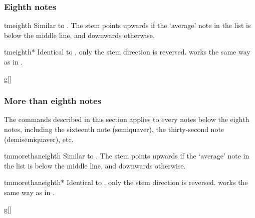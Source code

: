 \documentclass[11pt,a4paper]{ltxdoc}
\begin{document}
\subsubsection{Eighth notes}\label{sec:music-notes:commands:eighth}
\begin{docCommand}{tmeighth}{}
  Similar to . The stem points upwards if the `average' note 
  in the list is below the middle line, and downwards otherwise.
\end{docCommand}
\begin{docCommand}{tmeighth*}{}
  Identical to , only the stem direction is reversed. 
   works the same way as in .
\end{docCommand}
\begin{dispExample}
\begin{tmsinglestaff}%
  \begin{tmstaff}{g}[]
       
  \end{tmstaff}%
\end{tmsinglestaff}
\end{dispExample}
\subsubsection{More than eighth notes}\label{sec:music-notes:commands:more-than-eighth}
The commands described in this section applies to every notes below the eighth 
notes, including the sixteenth note (semiquaver), the thirty-second note 
(demisemiquaver), etc.
\begin{docCommand}{tmmorethaneighth}{}
  Similar to . The stem points upwards if the `average' note 
  in the list is below the middle line, and downwards otherwise.
\end{docCommand}
\begin{docCommand}{tmmorethaneighth*}{}
  Identical to , only the stem direction is reversed. 
   works the same way as in .
\end{docCommand}
\begin{dispExample}
\begin{tmsinglestaff}%
  \begin{tmstaff}{g}[]
  \end{tmstaff}%
\end{tmsinglestaff}
\end{dispExample}
\end{document}
